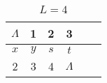 
\begin{table}
  \centering
  \caption{$L = 4$}
  \begin{tabular}{|c|c|c|c|c|c|}
    \hline
    $\Lambda$ & 1 & 2 & 3 & & \\ \hline
    $x$ & $y$ & $s$ & $t$ & & \\ \hline
    2 & 3 & 4 & $\Lambda$ & & \\ \hline
  \end{tabular}
\end{table}